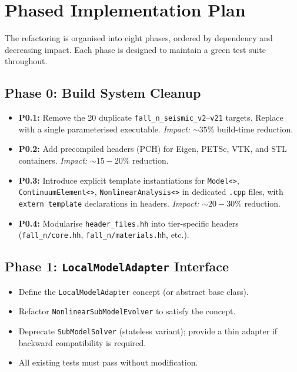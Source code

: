 \section{Phased Implementation Plan}
\label{sec:ms-plan}

The refactoring is organised into eight phases, ordered by
dependency and decreasing impact.  Each phase is designed to
maintain a green test suite throughout.

\subsection{Phase 0: Build System Cleanup}
\label{sec:ms-plan-phase0}

\begin{itemize}
  \item \textbf{P0.1:} Remove the 20 duplicate
    \texttt{fall\_n\_seismic\_v2}--\texttt{v21} targets.
    Replace with a single parameterised executable.
    \emph{Impact:} ${\sim}35\%$ build-time reduction.
  \item \textbf{P0.2:} Add precompiled headers (PCH) for Eigen,
    PETSc, VTK, and STL containers.
    \emph{Impact:} ${\sim}15{-}20\%$ reduction.
  \item \textbf{P0.3:} Introduce explicit template instantiations
    for \texttt{Model<>}, \texttt{ContinuumElement<>},
    \texttt{NonlinearAnalysis<>} in dedicated \texttt{.cpp} files,
    with \texttt{extern template} declarations in headers.
    \emph{Impact:} ${\sim}20{-}30\%$ reduction.
  \item \textbf{P0.4:} Modularise \texttt{header\_files.hh} into
    tier-specific headers
    (\texttt{fall\_n/core.hh}, \texttt{fall\_n/materials.hh}, etc.).
\end{itemize}

\subsection{Phase 1: \texttt{LocalModelAdapter} Interface}
\label{sec:ms-plan-phase1}

\begin{itemize}
  \item Define the \texttt{LocalModelAdapter} concept (or abstract
    base class).
  \item Refactor \texttt{NonlinearSubModelEvolver} to satisfy the
    concept.
  \item Deprecate \texttt{SubModelSolver} (stateless variant);
    provide a thin adapter if backward compatibility is required.
  \item All existing tests must pass without modification.
\end{itemize}

